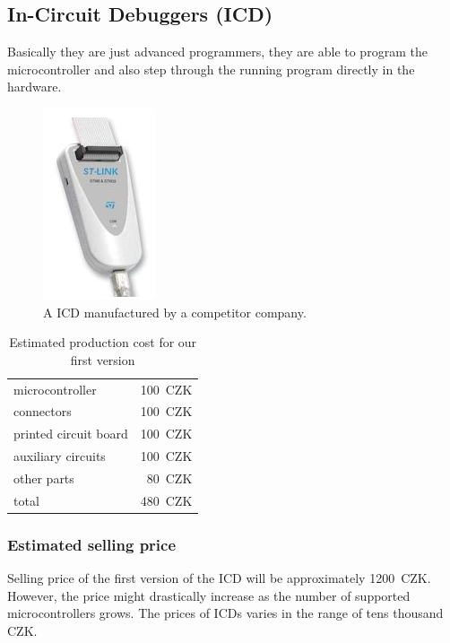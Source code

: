 \documentclass[a4paper,twoside,15pt]{book}
\begin{document}
        \subsection{In-Circuit Debuggers (ICD)}
            Basically they are just advanced programmers, they are able to program the microcontroller and also step through the running program directly in the hardware.

            \begin{figure}[h!]
                \centering{}
                \includegraphics[width=.15\textwidth]{images/debuger.png}
                \caption{A ICD manufactured by a competitor company.}
            \end{figure}

            \begin{table}[h!]
                \begin{tabular}{lr}
                    microcontroller         & 100~CZK       \\
                    connectors              & 100~CZK       \\
                    printed circuit board   & 100~CZK       \\
                    auxiliary circuits      & 100~CZK       \\
                    other parts             & 80~CZK        \\\hline
                    total                   & 480~CZK
                \end{tabular}
                \caption{Estimated production cost for our first version}
            \end{table}

            \subsubsection{Estimated selling price}
                Selling price of the first version of the ICD will be approximately 1200~CZK. However, the price might drastically increase as the number of supported microcontrollers grows. The prices of ICDs varies in the range of tens thousand CZK.
\end{document}
